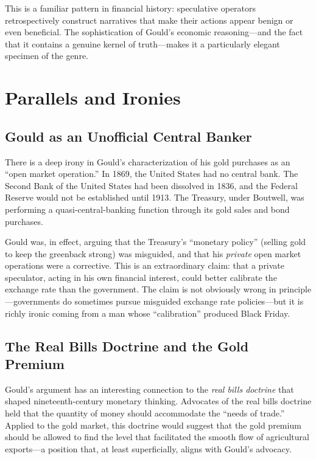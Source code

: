 \documentclass[12pt]{article}
\begin{document}
This is a familiar pattern in financial history: speculative operators 
retrospectively construct narratives that make their actions appear 
benign or even beneficial. The sophistication of Gould's economic 
reasoning---and the fact that it contains a genuine kernel of 
truth---makes it a particularly elegant specimen of the genre.

\section{Parallels and Ironies}

\subsection{Gould as an Unofficial Central Banker}

There is a deep irony in Gould's characterization of his gold purchases 
as an ``open market operation.'' In 1869, the United States had no 
central bank. The Second Bank of the United States had been dissolved 
in 1836, and the Federal Reserve would not be established until 1913. 
The Treasury, under Boutwell, was performing a quasi-central-banking 
function through its gold sales and bond purchases.

Gould was, in effect, arguing that the Treasury's ``monetary policy'' 
(selling gold to keep the greenback strong) was misguided, and that his 
\emph{private} open market operations were a corrective. This is an 
extraordinary claim: that a private speculator, acting in his own 
financial interest, could better calibrate the exchange rate than the 
government. The claim is not obviously wrong in principle---governments 
do sometimes pursue misguided exchange rate policies---but it is richly 
ironic coming from a man whose ``calibration'' produced Black Friday.

\subsection{The Real Bills Doctrine and the Gold Premium}

Gould's argument has an interesting connection to the \emph{real bills 
doctrine} that shaped nineteenth-century monetary thinking. Advocates 
of the real bills doctrine held that the quantity of money should 
accommodate the ``needs of trade.'' Applied to the gold market, this 
doctrine would suggest that the gold premium should be allowed to find 
the level that facilitated the smooth flow of agricultural exports---a 
position that, at least superficially, aligns with Gould's advocacy.
\end{document}
